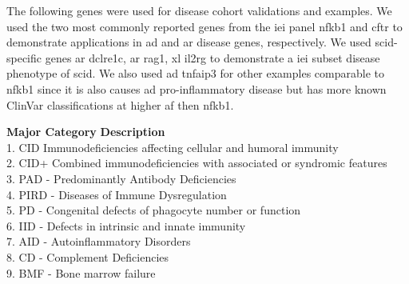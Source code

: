 The following genes were used for disease cohort validations and examples.
We used the two most commonly reported genes from the \ac{iei} panel \ac{nfkb1} 
\cite{tuijnenburgNFKB12018,
who1997primary,
cunningham1999common,
oksenhendler2008infections}
and \ac{cftr} 
\cite{naito2023uk, castellani2013cftr2, Grasemann2023cftr}
to demonstrate applications in \ac{ad} and \ac{ar} disease genes, respectively.
We used \ac{scid}-specific genes 
\ac{ar} \ac{dclre1c},
\ac{ar} \ac{rag1},
\ac{xl} \ac{il2rg} to demonstrate a \ac{iei} subset disease phenotype of 
\ac{scid}.
We also used \ac{ad} \ac{tnfaip3} for other examples comparable to \ac{nfkb1} since it is also causes \ac{ad} pro-inflammatory disease but has more known ClinVar classifications at higher \ac{af} then \ac{nfkb1}.




\begin{tcolorbox}[
    colback=white!0,
    colframe=black!70,
    boxrule=1pt,
    arc=1mm,
    outer arc=1mm,
    title=\textbf{\refstepcounter{myboxcounter}\label{box:definitions}Box \themyboxcounter: definitions}
]
\textbf{Major Category} \hspace{4em} \textbf{Description}\\[5pt]
1. CID  Immunodeficiencies affecting cellular and humoral immunity\\[2pt]
2. CID+  Combined immunodeficiencies with associated or syndromic features\\[2pt]
3. PAD - Predominantly Antibody Deficiencies\\[2pt]
4. PIRD - Diseases of Immune Dysregulation\\[2pt]
5. PD - Congenital defects of phagocyte number or function\\[2pt]
6. IID - Defects in intrinsic and innate immunity\\[2pt]
7. AID - Autoinflammatory Disorders\\[2pt]
8. CD - Complement Deficiencies\\[2pt]
9. BMF - Bone marrow failure
\end{tcolorbox}

